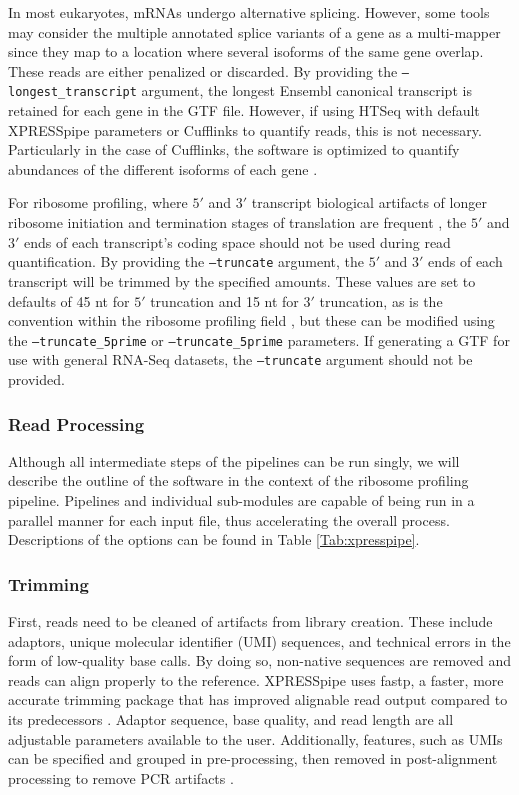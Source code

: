 \documentclass[10pt, oneside]{article}
\begin{document}
In most eukaryotes, mRNAs undergo alternative splicing. However, some tools may consider the multiple annotated splice variants of a gene as a multi-mapper since they map to a location where several isoforms of the same gene overlap. These reads are either penalized or discarded. By providing the \texttt{--longest\_transcript} argument, the longest Ensembl canonical transcript \cite{ensembl_canon} is retained for each gene in the GTF file. However, if using HTSeq with default XPRESSpipe parameters or Cufflinks to quantify reads, this is not necessary. Particularly in the case of Cufflinks, the software is optimized to quantify abundances of the different isoforms of each gene \cite{cufflinks}. \par

For ribosome profiling, where $5'$ and $3'$ transcript biological artifacts of longer ribosome initiation and termination stages of translation are frequent \cite{ingolia_meth, weinberg_reports}, the $5'$ and $3'$ ends of each transcript's coding space should not be used during read quantification. By providing the \texttt{--truncate} argument, the $5'$ and $3'$ ends of each transcript will be trimmed by the specified amounts. These values are set to defaults of 45 nt for $5'$ truncation and 15 nt for $3'$ truncation, as is the convention within the ribosome profiling field \cite{ingolia_meth}, but these can be modified using the \texttt{--truncate\_5prime} or \texttt{--truncate\_5prime} parameters. If generating a GTF for use with general RNA-Seq datasets, the \texttt{--truncate} argument should not be provided.

\subsubsection{Read Processing}
Although all intermediate steps of the pipelines can be run singly, we will describe the outline of the software in the context of the ribosome profiling pipeline. Pipelines and individual sub-modules are capable of being run in a parallel manner for each input file, thus accelerating the overall process. Descriptions of the options can be found in Table \ref{Tab:xpresspipe}.

\subsubsection{Trimming}
First, reads need to be cleaned of artifacts from library creation. These include adaptors, unique molecular identifier (UMI) sequences, and technical errors in the form of low-quality base calls. By doing so, non-native sequences are removed and reads can align properly to the reference. XPRESSpipe uses fastp, a faster, more accurate trimming package that has improved alignable read output compared to its predecessors \cite{fastp}. Adaptor sequence, base quality, and read length are all adjustable parameters available to the user. Additionally, features, such as UMIs can be specified and grouped in pre-processing, then removed in post-alignment processing to remove PCR artifacts \cite{umi, umitools}.
\end{document}

